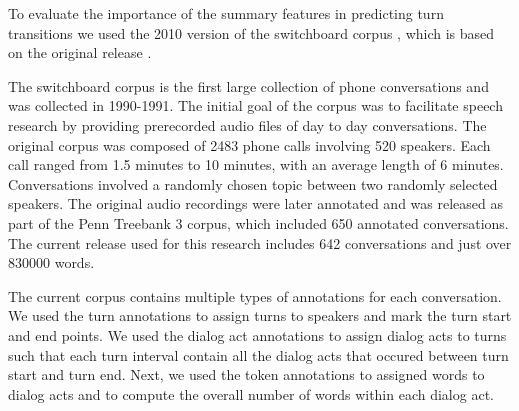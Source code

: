 To evaluate the importance of the summary features in predicting turn transitions we used the 2010 version of the switchboard corpus \cite{calhoun2010nxt}, which is based on the original release \cite{225858}.

The switchboard corpus is the first large collection of phone conversations and was collected in 1990-1991. The initial goal of the corpus was to facilitate speech research by providing prerecorded audio files of day to day conversations. The original corpus was composed of 2483 phone calls involving 520 speakers. Each call ranged from 1.5 minutes to 10 minutes, with an average length of 6 minutes. Conversations involved a randomly chosen topic between two randomly selected speakers. The original audio recordings were later annotated and was released as part of the Penn Treebank 3 corpus, which included 650 annotated conversations. The current release used for this research includes 642 conversations and just over 830000 words.

The current corpus contains multiple types of annotations for each conversation. We used the turn annotations to assign turns to speakers and mark the turn start and end points. We used the dialog act annotations to assign dialog acts to turns such that each turn interval contain all the dialog acts that occured between turn start and turn end. Next, we used the token annotations to assigned words to dialog acts and to compute the overall number of words within each dialog act.
